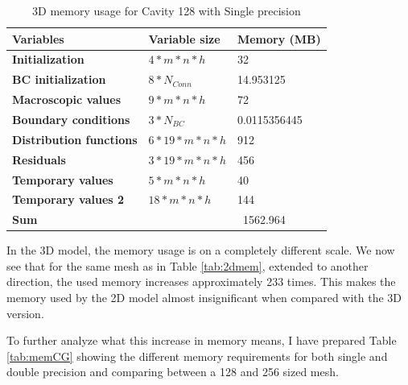 \documentclass[12pt, openany]{book}
\begin{document}
\begin{table}[H]
	\centering
	\begin{tabular}{|l|l|l|}
		\hline
		\textbf{Variables}              & \textbf{Variable size}   & \textbf{Memory (MB)} \\ \hline
		\textbf{Initialization}         & $4 * m * n * h$          & 32                   \\ \hline
		\textbf{BC initialization}      & $8 * N_{Conn}$           & 14.953125            \\ \hline
		\textbf{Macroscopic values}     & $9 * m * n * h$          & 72                   \\ \hline
		\textbf{Boundary conditions}    & $3 * N_{BC}$             & 0.0115356445         \\ \hline
		\textbf{Distribution functions} & $6 * 19 * m * n * h$     & 912                  \\ \hline
		\textbf{Residuals}              & $3 * 19 * m * n * h$     & 456                  \\ \hline
		\textbf{Temporary values}       & $5 * m * n * h$          & 40                   \\ \hline
		\textbf{Temporary values 2}     & $18 * m * n * h$         & 144                  \\ \hline
		\textbf{Sum}                    &                          & ~1562.964      \\ \hline
	\end{tabular}
	\caption{3D memory usage for Cavity 128 with Single precision}
	\label{tab:3dmem}
\end{table}

In the 3D model, the memory usage is on a completely different scale. We now see that for the same mesh as in Table \ref{tab:2dmem}, extended to another direction, the used memory increases approximately 233 times. This makes the memory used by the 2D model almost insignificant when compared with the 3D version.\par
To further analyze what this increase in memory means, I have prepared Table \ref{tab:memCG} showing the different memory requirements for both single and double precision and comparing between a 128 and 256 sized mesh.
\end{document}
